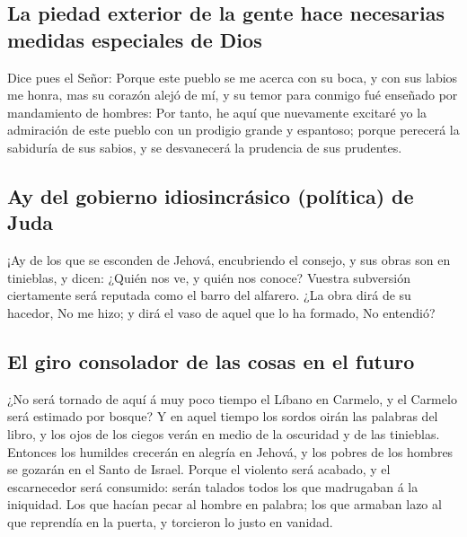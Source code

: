 \hypertarget{la-piedad-exterior-de-la-gente-hace-necesarias-medidas-especiales-de-dios}{%
\subsection{La piedad exterior de la gente hace necesarias medidas
especiales de
Dios}\label{la-piedad-exterior-de-la-gente-hace-necesarias-medidas-especiales-de-dios}}

 Dice pues el Señor: Porque este pueblo se me acerca con
su boca, y con sus labios me honra, mas su corazón alejó de mí, y su
temor para conmigo fué enseñado por mandamiento de hombres:
 Por tanto, he aquí que nuevamente excitaré yo la
admiración de este pueblo con un prodigio grande y espantoso; porque
perecerá la sabiduría de sus sabios, y se desvanecerá la prudencia de
sus prudentes.

\hypertarget{ay-del-gobierno-idiosincruxe1sico-poluxedtica-de-juda}{%
\subsection{Ay del gobierno idiosincrásico (política) de
Juda}\label{ay-del-gobierno-idiosincruxe1sico-poluxedtica-de-juda}}

 ¡Ay de los que se esconden de Jehová, encubriendo el
consejo, y sus obras son en tinieblas, y dicen: ¿Quién nos ve, y quién
nos conoce?  Vuestra subversión ciertamente será reputada
como el barro del alfarero. ¿La obra dirá de su hacedor, No me hizo; y
dirá el vaso de aquel que lo ha formado, No entendió?

\hypertarget{el-giro-consolador-de-las-cosas-en-el-futuro}{%
\subsection{El giro consolador de las cosas en el
futuro}\label{el-giro-consolador-de-las-cosas-en-el-futuro}}

 ¿No será tornado de aquí á muy poco tiempo el Líbano en
Carmelo, y el Carmelo será estimado por bosque?  Y en
aquel tiempo los sordos oirán las palabras del libro, y los ojos de los
ciegos verán en medio de la oscuridad y de las tinieblas.
 Entonces los humildes crecerán en alegría en Jehová, y
los pobres de los hombres se gozarán en el Santo de Israel.
 Porque el violento será acabado, y el escarnecedor será
consumido: serán talados todos los que madrugaban á la iniquidad.
 Los que hacían pecar al hombre en palabra; los que
armaban lazo al que reprendía en la puerta, y torcieron lo justo en
vanidad.

